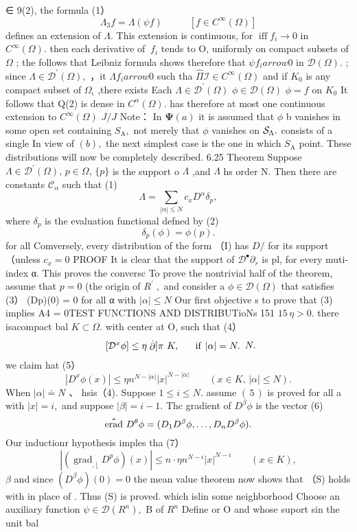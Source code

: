 ∈ 9(2), the formula (1） $$ \Lambda_{\mathrm{3}}\!f=\Lambda(\psi\!f)\;\;\;\;\;\;\;\;\;\;\left[f\in C^{\infty}(\Omega)\right] $$ defines an extension of $\Lambda.$ This extension is continuous, for $\operatorname{iff}f_{i}\to0$ in $C^{\infty}(\Omega).$ then each derivative of $\ f_{i}$ tends to O, uniformly on compact subsets of $\Omega$ ; the follows that Leibniz formula shows therefore that $\psi f_{i} arrow0$ in ${\mathcal{D}}(\Omega).$ ; since $\Lambda\in{\mathcal{D}}^{\prime}(\Omega),$ ，it $\Lambda f_{i}{ arrow}0$ such tha ${\hat{\Pi}}{\mathcal{I}}\in C^{\infty}(\Omega)$ and if $K_{0}$ is any compact subset of $\Omega_{\mathrm{\iota}}$ ,there exists Each $\Lambda\in{\mathcal{D}}^{\prime}(\Omega)$ $\phi\in{\mathcal{D}}(\Omega)$ $\phi=f$ on $K_{0}$ It follows that Q(2) is dense in $C^{\alpha}(\Omega).$ has therefore at most one continuous extension to $C^{\infty}(\Omega)$ $J/J$ Note： In $\mathbf{\Psi}(a)$ it is assumed that $\phi$ b vanishes in some open set containing $S_{\mathrm{A}},$ not merely that $\phi$ vanishes on ${\cal S}_{\Lambda}.$ consists of a single In view of $(b),$ the next simplest case is the one in which $S_{\mathrm{A}}$ point. These distributions will now be completely described. 6.25 Theorem Suppose $\Lambda\in{\mathcal{D}}^{\prime}(\Omega),\,p\in\Omega,\,\{p\}$ is the support o $\Lambda$ ,and $\Lambda$ hs order N. Then there are constants ${\mathcal{C}}_{\alpha}$ such that (1) $$ \Lambda=\sum_{|\alpha|\leq N}c_{x}D^{\alpha}\delta_{p}, $$ where $\delta_{p}$ is the evaluation functional defned by (2) $$ \delta_{p}(\phi)=\phi(p). $$ for all Comversely, every distribution of the form （I) has $D\!\!\!\!/$ for its support （unless $\scriptstyle c_{x}=0$ PROOF It is clear that the support of ${\mathcal{D}}^{\bullet}\partial_{r}$ is {pl}, for every muti-index α. This proves the conversc To prove the nontrivial half of the theorem, assume that $p=0$ (the origin of $\scriptstyle{R^{\prime}}\;,$ and consider a $\phi\in{\mathcal{D}}(\Omega)$ that satisfies (3） (Dp)(0) = 0 for all α with $|\alpha|\leq N$ Our first objective s to prove that (3) implies A4 = 0TEST FUNCTIONS AND DISTRIBUTioNs 151 $15\,\eta>0.$ there isacompact bal $K\subset\Omega.$ with center at O, such that (4） $$ \begin{array}{c c c}{{\lbrack{\cal D}^{x}\phi\rbrack\leq\eta\stackrel{.}{\partial}\rbrack\pi\ K,}}&{{\;\;\;\mathrm{if}\ |\alpha|=N.}}\end{array}N. $$ we claim hat (5） $$ |D^{x}\phi(x)|\leq\eta n^{N-|\alpha|}|x|^{N-|\alpha|}\quad\quad(x\in K,\,|\alpha|\leq N). $$ When $|\alpha|\doteq N$ 、 hsis（4). Suppose $1\leq i\leq N.$ assume $(\,5\,)$ is proved for all a with $|x|=i,$ and suppose $|\beta|=i-1.$ Thc gradient of $D^{\beta}\phi$ is the vector (6) $$ {\bf\hat{\mathrm{erad}}}\ D^{\theta}\phi=(D_{1}D^{\beta}\phi,\ldots,D_{n}D^{\beta}\phi). $$ Our inductionr hypothesis imples tha (7） $$ |(\operatorname{grad}_{,\lfloor}D^{p}\phi)(x)|\leq n\cdot\eta n^{N-i}|x|^{N-i}\qquad(x\in K), $$ $\beta$ and since $(D^{\beta}\phi)(0)=0$ the mean value theorem now shows that （S) holds with in place of . Thus (S) is proved. which islin some neighborhood Choose an auxiliary function $\psi\in{\mathcal{D}}(R^{n}),$ B of ${\mathit{R}}^{n}$ Define or O and whose suport sin the unit bal 